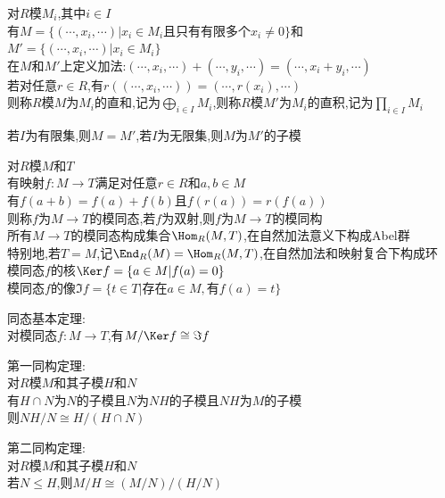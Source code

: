 \begin{dingyi}
对$R$模$M_i$,其中$i\in I$\\
有$M=\{(\cdots,x_i,\cdots)|x_i\in M_i\text{且只有有限多个}x_i\neq 0\}$和$M'=\{(\cdots,x_i,\cdots)|x_i\in M_i\}$\\
在$M$和$M'$上定义加法:$(\cdots,x_i,\cdots)+(\cdots,y_i,\cdots)=(\cdots,x_i+y_i,\cdots)$\\
若对任意$r\in R$,有$r((\cdots,x_i,\cdots))=(\cdots,r(x_i),\cdots)$\\
则称$R$模$M$为$M_i$的直和,记为$\bigoplus\limits_{i\in I}M_i$,则称$R$模$M'$为$M_i$的直积,记为$\prod\limits_{i\in I}M_i$ 
\end{dingyi}

\begin{zhu}
若$I$为有限集,则$M=M'$,若$I$为无限集,则$M$为$M'$的子模
\end{zhu}

\begin{dingyi}
对$R$模$M$和$T$\\
有映射$f:M\to T$满足对任意$r\in R$和$a,b\in M$\\
有$f(a+b)=f(a)+f(b)$且$f(r(a))=r(f(a))$\\
则称$f$为$M\to T$的模同态,若$f$为双射,则$f$为$M\to T$的模同构\\
所有$M\to T$的模同态构成集合$\Hom_{R}(M,T)$,在自然加法意义下构成Abel群\\
特别地,若$T=M$,记$\End_{R}(M)=\Hom_{R}(M,T)$,在自然加法和映射复合下构成环\\
模同态$f$的核$\Ker f=\{a\in M|f(a)=0\}$\\
模同态$f$的像$\Im f=\{t\in T|\text{存在}a\in M,\text{有}f(a)=t\}$
\end{dingyi}

\begin{dingli}
同态基本定理:\\
对模同态$f:M\to T$,有$M/\Ker f\cong \Im f$
\end{dingli}

\begin{dingli}
第一同构定理:\\
对$R$模$M$和其子模$H$和$N$\\
有$H\cap N$为$N$的子模且$N$为$NH$的子模且$NH$为$M$的子模\\
则$NH/N\cong H/(H\cap N)$
\end{dingli}

\begin{dingli}
第二同构定理:\\
对$R$模$M$和其子模$H$和$N$\\
若$N\leq H$,则$M/H\cong (M/N)/(H/N)$
\end{dingli}

